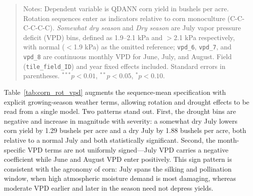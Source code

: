 \documentclass[12pt,letterpaper]{article}
\theoremstyle{remark}
\theoremstyle{remark}
\theoremstyle{plain}
\theoremstyle{definition}
\begin{document}

\begin{quote}
\small
Notes: Dependent variable is QDANN corn yield in bushels per acre. Rotation
sequences enter as indicators relative to corn monoculture (C-C-C-C-C-C).
\emph{Somewhat dry season} and \emph{Dry season} are July vapor pressure deficit
(VPD) bins, defined as 1.9--2.1 kPa and $>$2.1 kPa respectively, with normal
($<$1.9 kPa) as the omitted reference; \texttt{vpd\_6}, \texttt{vpd\_7}, and
\texttt{vpd\_8} are continuous monthly VPD for June, July, and August. Field
(\texttt{tile\_field\_ID}) and year fixed effects included. Standard errors in
parentheses. $^{***}p<0.01$, $^{**}p<0.05$, $^{*}p<0.10$.
\end{quote}

Table~\ref{tab:corn_rot_vpd} augments the sequence-mean specification with
explicit growing-season weather terms, allowing rotation and drought effects to
be read from a single model. Two patterns stand out. First, the drought bins are
negative and increase in magnitude with severity: a somewhat dry July lowers corn
yield by 1.29 bushels per acre and a dry July by 1.88 bushels per acre, both
relative to a normal July and both statistically significant. Second, the
month-specific VPD terms are not uniformly signed---July VPD carries a negative
coefficient while June and August VPD enter positively. This sign pattern is
consistent with the agronomy of corn: July spans the silking and pollination
window, when high atmospheric moisture demand is most damaging, whereas moderate
VPD earlier and later in the season need not depress yields.
\end{document}
